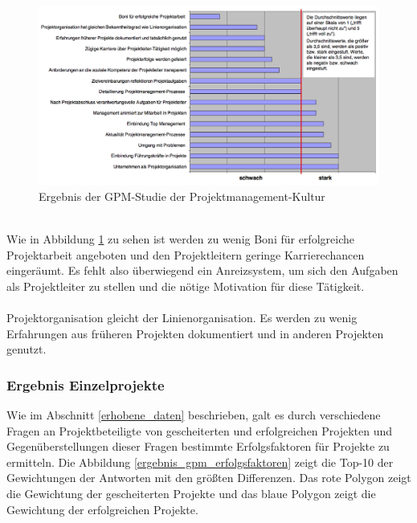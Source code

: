 \documentclass[12pt]{scrartcl}
\begin{document}
\begin{figure}[H]
	\begin{center}
		\includegraphics[width=1.0\textwidth]{img/ergebnis_gpm_studie_kultur}
		\caption{Ergebnis der GPM-Studie der Projektmanagement-Kultur}
		\label{erfgebnis_gpm_studie_pmk}	
	\end{center}
\end{figure}
\ \\
Wie in Abbildung \ref{erfgebnis_gpm_studie_pmk} zu sehen ist werden zu wenig Boni für erfolgreiche Projektarbeit angeboten und den Projektleitern geringe Karrierechancen eingeräumt. Es fehlt also überwiegend ein Anreizsystem, um sich den Aufgaben als Projektleiter zu stellen und die nötige Motivation für diese Tätigkeit.\\
\\ 
Projektorganisation gleicht der Linienorganisation. Es werden zu wenig Erfahrungen aus früheren Projekten dokumentiert und in anderen Projekten genutzt.

\subsubsection{Ergebnis Einzelprojekte}
\label{ergebnis_einzel}

Wie im Abschnitt \ref{erhobene_daten} beschrieben, galt es durch verschiedene Fragen an Projektbeteiligte von gescheiterten und erfolgreichen Projekten und Gegenüberstellungen dieser Fragen bestimmte Erfolgsfaktoren für Projekte zu ermitteln. Die Abbildung \ref{ergebnis_gpm_erfolgsfaktoren} zeigt die Top-10 der Gewichtungen der Antworten mit den größten Differenzen. Das rote Polygon zeigt die Gewichtung der gescheiterten Projekte und das blaue Polygon zeigt die Gewichtung der erfolgreichen Projekte. 
\end{document}
